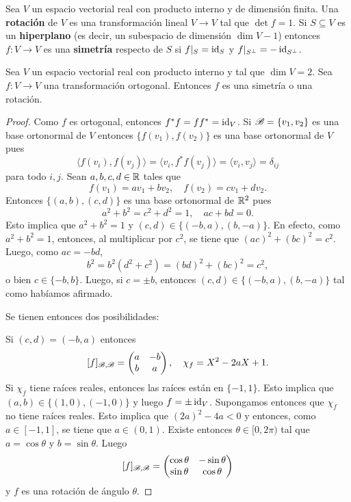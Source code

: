\begin{block}
    Sea $V$ un espacio vectorial real con producto interno y de dimensión
    finita.  Una \textbf{rotación} de $V$ es una transformación lineal $V\to V$
    tal que $\det f=1$. Si $S\subseteq V$ es un \textbf{hiperplano} (es decir,
    un subespacio de dimensión $\dim V-1$) entonces $f\colon V\to V$ es una
    \textbf{simetría} respecto de $S$ si $f|_S=\operatorname{id}_S$ y
    $f|_{S^\perp}=-\operatorname{id}_{S^\perp}$. 
\end{block}

\begin{prop}
    \label{pro:ortogonales:dim=2}
    Sea $V$ un espacio vectorial real con producto interno y tal que $\dim
    V=2$. Sea $f\colon V\to V$ una transformación ortogonal. Entonces $f$ es
    una simetría o una rotación. 

   \begin{proof}
		Como $f$ es ortogonal, entonces $f^*f=ff^*=\operatorname{id}_V$. Si $\mathscr{B}=\{v_1,v_2\}$
		es una base ortonormal de $V$ entonces $\{f(v_1),f(v_2)\}$ es una base
		ortonormal de $V$ pues
        \[
        \langle f(v_i),f(v_j)\rangle=\langle v_i,f^*f(v_j)\rangle=\langle v_i,v_j\rangle=\delta_{ij}
        \]
        para todo $i,j$. Sean $a,b,c,d\in\mathbb{R}$ tales que 
        \[
            f(v_1)=av_1+bv_2,\quad
            f(v_2)=cv_1+dv_2.
        \]
        Entonces $\{(a,b),(c,d)\}$ es una base ortonormal de $\mathbb{R}^2$ pues
        \[
            a^2+b^2=c^2+d^2=1,\quad
            ac+bd=0. 
        \]
        Esto implica que $a^2+b^2=1$ y $(c,d)\in\{(-b,a),(b,-a)\}$. En efecto, 
		como $a^2+b^2=1$, entonces, al multiplicar por $c^2$, se tiene que 
		$(ac)^2+(bc)^2=c^2$. Luego, como $ac=-bd$, 
		\[
		b^2=b^2(d^2+c^2)=(bd)^2+(bc)^2=c^2,
		\]
		o bien $c\in\{-b,b\}$. Luego, si $c=\pm b$, entonces
		$(c,d)\in\{(-b,a),(b,-a)\}$ tal como habíamos afirmado.
		
		Se tienen
        entonces dos posibilidades:

        Si $(c,d)=(-b,a)$ entonces 
        \[
        [f]_{\mathscr{B},\mathscr{B}}=\begin{pmatrix}
            a & -b\\
            b & a
        \end{pmatrix},\quad
        \chi_f=X^2-2aX+1. 
        \]
		Si $\chi_f$ tiene raíces reales, entonces las raíces están en
		$\{-1,1\}$. Esto implica que $(a,b)\in\{(1,0),(-1,0)\}$ y luego
		$f=\pm\operatorname{id}_V$. Supongamos entonces que $\chi_f$ no tiene raíces reales. Esto implica que $(2a)^2-4a<0$ y 
		entonces, como $a\in[-1,1]$, se tiene que $a\in(0,1)$. 
		Existe entonces $\theta\in[0,2\pi)$ tal que $a=\cos\theta$ y
		$b=\sin\theta$. Luego
        \[
        [f]_{\mathscr{B},\mathscr{B}}=\begin{pmatrix}
            \cos\theta & -\sin\theta\\
            \sin\theta & \cos\theta
        \end{pmatrix}
        \]
        y $f$ es una rotación de ángulo $\theta$. 


\end{proof}
\end{prop}

